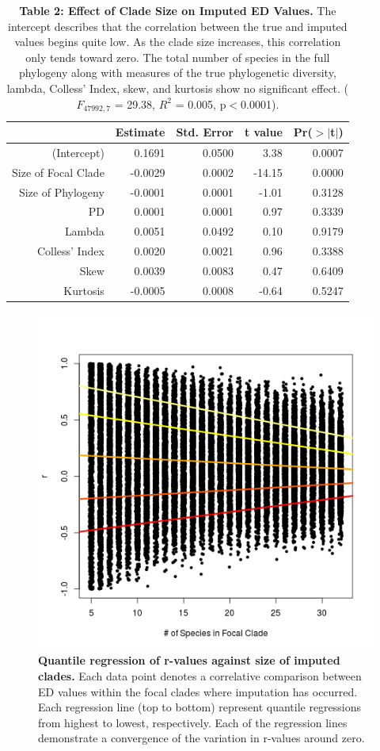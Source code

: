 \documentclass[12pt,english]{article}
\begin{document}
\begin{table}[ht] 
\centering
\begin{tabular}{rrrrr}
  \hline
  & Estimate & Std. Error & t value & Pr($>$$|$t$|$) \\
   \hline
   (Intercept) & 0.1691 & 0.0500 & 3.38 & 0.0007 \\
   Size of Focal Clade & -0.0029 & 0.0002 & -14.15 & 0.0000 \\
   Size of Phylogeny & -0.0001 & 0.0001 & -1.01 & 0.3128 \\
   PD & 0.0001 & 0.0001 & 0.97 & 0.3339 \\
   Lambda & 0.0051 & 0.0492 & 0.10 & 0.9179 \\
   Colless' Index & 0.0020 & 0.0021 & 0.96 & 0.3388 \\
   Skew & 0.0039 & 0.0083 & 0.47 & 0.6409 \\
   Kurtosis & -0.0005 & 0.0008 & -0.64 & 0.5247 \\
   \hline
   \hline
\end{tabular}
\caption*{\textbf{Table 2: Effect of Clade Size on Imputed ED Values.} The
intercept describes that the correlation between the true and imputed values
begins quite low. As the clade size increases, this correlation only tends
toward zero. The total number of species in the full phylogeny along with
measures of the true phylogenetic diversity, lambda, Colless' Index, skew, and
kurtosis show no significant effect. ($F_{47992, 7}$ = 29.38, $R^{2}$ = 0.005,
p$<$0.0001).}
\end{table}

\begin{figure}[!ht]
  \center
  \includegraphics[width=.5\textwidth]{quantModel.png}
  \caption{\textbf{Quantile regression of r-values against size of imputed
  clades.} Each data point denotes a correlative comparison between ED values
  within the focal clades where imputation has occurred. Each regression line
  (top to bottom) represent quantile regressions from highest to lowest,
  respectively. Each of the regression lines demonstrate a convergence of the
  variation in r-values around zero.}
  \label{quantReg}
\end{figure}
\end{document}

